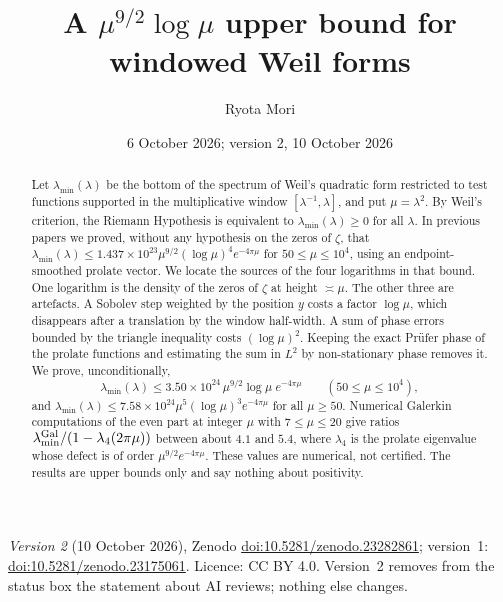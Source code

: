 \documentclass[11pt]{amsart}
\title[A $\mu^{9/2}\log\mu$ upper bound for windowed Weil forms]{A $\mu^{9/2}\log\mu$ upper bound for windowed Weil forms}
\author{Ryota Mori}
\date{6 October 2026; version 2, 10 October 2026}
\newcommand{\doi}[1]{\href{https://doi.org/#1}{doi:#1}}
\theoremstyle{remark}
\numberwithin{equation}{section}
\begin{document}
\begin{abstract}
Let $\lambda_{\min}(\lambda)$ be the bottom of the spectrum of Weil's quadratic form restricted to test functions supported in the multiplicative window $[\lambda^{-1},\lambda]$, and put $\mu=\lambda^2$. By Weil's criterion, the Riemann Hypothesis is equivalent to $\lambda_{\min}(\lambda)\ge0$ for all $\lambda$. In previous papers we proved, without any hypothesis on the zeros of $\zeta$, that $\lambda_{\min}(\lambda)\le1.437\times10^{23}\mu^{9/2}(\log\mu)^4e^{-4\pi\mu}$ for $50\le\mu\le10^4$, using an endpoint-smoothed prolate vector. We locate the sources of the four logarithms in that bound. One logarithm is the density of the zeros of $\zeta$ at height $\asymp\mu$. The other three are artefacts. A Sobolev step weighted by the position $y$ costs a factor $\log\mu$, which disappears after a translation by the window half-width. A sum of phase errors bounded by the triangle inequality costs $(\log\mu)^2$. Keeping the exact Pr\"ufer phase of the prolate functions and estimating the sum in $L^2$ by non-stationary phase removes it. We prove, unconditionally,
\[
\lambda_{\min}(\lambda)\le3.50\times10^{24}\,\mu^{9/2}\log\mu\;e^{-4\pi\mu}\qquad(50\le\mu\le10^4),
\]
and $\lambda_{\min}(\lambda)\le7.58\times10^{24}\mu^5(\log\mu)^3e^{-4\pi\mu}$ for all $\mu\ge50$. Numerical Galerkin computations of the even part at integer $\mu$ with $7\le\mu\le20$ give ratios $\lambda_{\min}^{\rm Gal}/(1-\lambda_4(2\pi\mu))$ between about $4.1$ and $5.4$, where $\lambda_4$ is the prolate eigenvalue whose defect is of order $\mu^{9/2}e^{-4\pi\mu}$. These values are numerical, not certified. The results are upper bounds only and say nothing about positivity.
\end{abstract}

\maketitle

\begin{sloppypar}
\noindent\textit{Version 2} (10 October 2026), Zenodo \doi{10.5281/zenodo.23282861}; version~1: \doi{10.5281/zenodo.23175061}. Licence: CC BY 4.0. Version~2 removes from the status box the statement about AI reviews; nothing else changes.
\end{sloppypar}

\begin{center}
\end{center}
\end{document}
